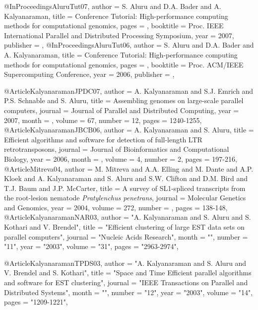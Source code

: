 @InProceedings{AluruTut07,
  author =       {S. Aluru and D.A. Bader and A. Kalyanaraman},
  title =  {Conference Tutorial: High-performance computing methods for computational genomics},
  pages =        {},
  booktitle =    {Proc. IEEE International Parallel and Distributed Processing Symposium},
  year =         {2007},
  publisher =    {},
}
@InProceedings{AluruTut06,
  author =       {S. Aluru and D.A. Bader and A. Kalyanaraman},
  title =  {Conference Tutorial: High-performance computing methods for computational genomics},
  pages =        {},
  booktitle =    {Proc. ACM/IEEE Supercomputing Conference},
  year =         {2006},
  publisher =    {},
}

@Article{KalyanaramanJPDC07,
  author =       {A. Kalyanaraman and S.J. Emrich and P.S. Schnable and S. Aluru},
  title =        {Assembling genomes on large-scale parallel computers},
  journal = {Journal of Parallel and Distributed Computing},
  year = {2007},
  month = {},
  volume =  {67},
  number =  {12},
  pages =   {1240-1255},
}
@Article{KalyanaramanJBCB06,
  author =  {A. Kalyanaraman and S. Aluru},
  title = {{Efficient algorithms and software for detection of full-length LTR retrotransposons}},
  journal = {Journal of Bioinformatics and Computational Biology},
  year = {2006},
  month = {},
  volume =  {4},
  number =  {2},
  pages =   {197-216},
}
@Article{Mitreva04,
  author = {M. Mitreva and A.A. Elling and M. Dante and A.P. Kloek and A. Kalyanaraman and S. Aluru and S.W. Clifton and D.M. Bird and T.J. Baum and J.P. McCarter},
  title =  {{A survey of SL1-spliced transcripts from the root-lesion nematode {\it Pratylenchus penetrans}}},
  journal = {Molecular Genetics and Genomics},
  year = {2004},
  volume =  {272},
  number =  {},
  pages =   {138-148},
}
@Article{KalyanaramanNAR03,
   author =   "A. Kalyanaraman and S. Aluru and S. Kothari and V. Brendel",
   title =   "Efficient clustering of large \uppercase{EST} data sets on parallel computers",
   journal =   "Nucleic Acids Research",
   month = "",
   number = "11",
   year =   "2003",
   volume =   "31",
   pages =   "2963-2974",
}

@Article{KalyanaramanTPDS03,
   author =   "A. Kalyanaraman and S. Aluru and V. Brendel and S. Kothari",
   title =   "Space and Time Efficient parallel algorithms and software for \uppercase{EST} clustering",
   journal =   "IEEE Transactions on Parallel and Distributed Systems",
   month = "",
   number = "12",
   year =   "2003",
   volume =   "14",
   pages =   "1209-1221",
}

